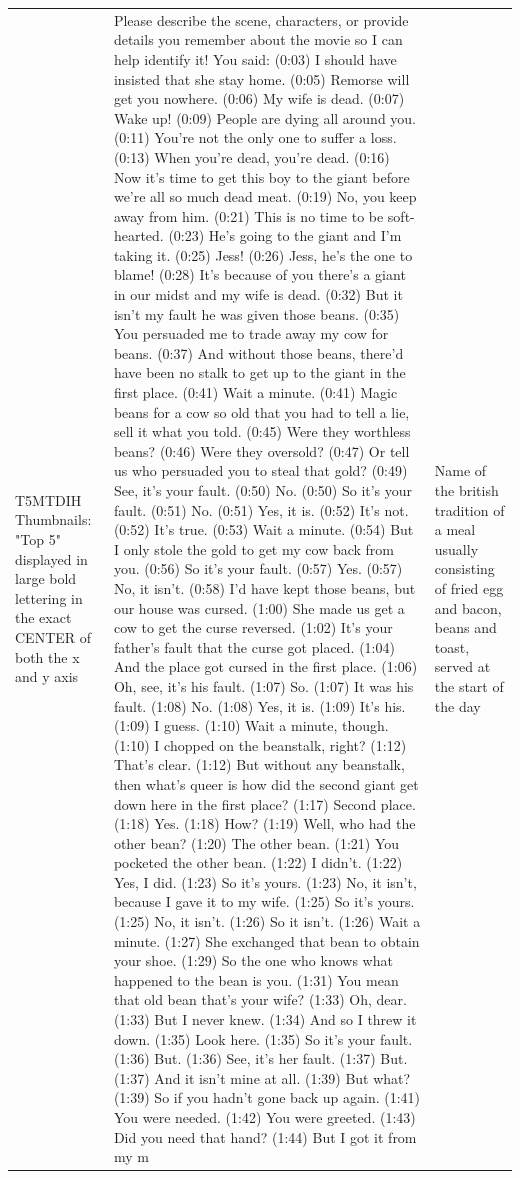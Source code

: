\begin{table}[ht]
\begin{tabular}{p{4.3cm}p{4.3cm}p{4.3cm}}
T5MTDIH Thumbnails: "Top 5" displayed in large bold lettering in the exact CENTER of both the x and y axis & Please describe the scene, characters, or provide details you remember about the movie so I can help identify it!        You said: (0:03) I should have insisted that she stay home. (0:05) Remorse will get you nowhere. (0:06) My wife is dead. (0:07) Wake up! (0:09) People are dying all around you. (0:11) You're not the only one to suffer a loss. (0:13) When you're dead, you're dead. (0:16) Now it's time to get this boy to the giant before we're all so much dead meat. (0:19) No, you keep away from him. (0:21) This is no time to be soft-hearted. (0:23) He's going to the giant and I'm taking it. (0:25) Jess! (0:26) Jess, he's the one to blame! (0:28) It's because of you there's a giant in our midst and my wife is dead. (0:32) But it isn't my fault he was given those beans. (0:35) You persuaded me to trade away my cow for beans. (0:37) And without those beans, there'd have been no stalk to get up to the giant in the first place. (0:41) Wait a minute. (0:41) Magic beans for a cow so old that you had to tell a lie, sell it what you told. (0:45) Were they worthless beans? (0:46) Were they oversold? (0:47) Or tell us who persuaded you to steal that gold? (0:49) See, it's your fault. (0:50) No. (0:50) So it's your fault. (0:51) No. (0:51) Yes, it is. (0:52) It's not. (0:52) It's true. (0:53) Wait a minute. (0:54) But I only stole the gold to get my cow back from you. (0:56) So it's your fault. (0:57) Yes. (0:57) No, it isn't. (0:58) I'd have kept those beans, but our house was cursed. (1:00) She made us get a cow to get the curse reversed. (1:02) It's your father's fault that the curse got placed. (1:04) And the place got cursed in the first place. (1:06) Oh, see, it's his fault. (1:07) So. (1:07) It was his fault. (1:08) No. (1:08) Yes, it is. (1:09) It's his. (1:09) I guess. (1:10) Wait a minute, though. (1:10) I chopped on the beanstalk, right? (1:12) That's clear. (1:12) But without any beanstalk, then what's queer is how did the second giant get down here in the first place? (1:17) Second place. (1:18) Yes. (1:18) How? (1:19) Well, who had the other bean? (1:20) The other bean. (1:21) You pocketed the other bean. (1:22) I didn't. (1:22) Yes, I did. (1:23) So it's yours. (1:23) No, it isn't, because I gave it to my wife. (1:25) So it's yours. (1:25) No, it isn't. (1:26) So it isn't. (1:26) Wait a minute. (1:27) She exchanged that bean to obtain your shoe. (1:29) So the one who knows what happened to the bean is you. (1:31) You mean that old bean that's your wife? (1:33) Oh, dear. (1:33) But I never knew. (1:34) And so I threw it down. (1:35) Look here. (1:35) So it's your fault. (1:36) But. (1:36) See, it's her fault. (1:37) But. (1:37) And it isn't mine at all. (1:39) But what? (1:39) So if you hadn't gone back up again. (1:41) You were needed. (1:42) You were greeted. (1:43) Did you need that hand? (1:44) But I got it from my m & Name of the british tradition of a meal usually consisting of fried egg and bacon, beans and toast, served at the start of the day \\[4pt]

\end{tabular}
\end{table}
